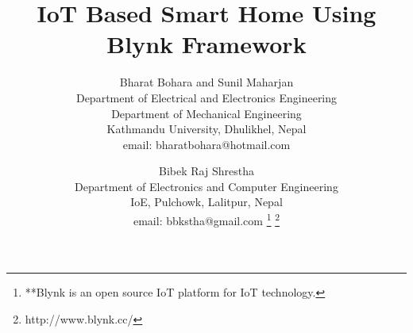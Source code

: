 \documentclass[journal,twoside]{IEEEtran}
\begin{document}
\setcounter{page}{27}
%
\title{IoT Based Smart Home Using Blynk Framework}
%
%
%

\author{
  Bharat Bohara and Sunil Maharjan\\
  Department of Electrical and Electronics Engineering\\
  Department of Mechanical Engineering\\
  Kathmandu University, Dhulikhel, Nepal\\
  email: bharatbohara@hotmail.com\\
  \and
  \vspace{0.4cm}
  Bibek Raj Shrestha\\
  Department of Electronics and Computer Engineering\\
  IoE, Pulchowk, Lalitpur, Nepal\\
  email: bbkstha@gmail.com
  \thanks{**Blynk \cite{Blynk2016} is an open source IoT platform for IoT technology.}%
    \thanks{http://www.blynk.cc/}
}

% 
%
\end{document}
